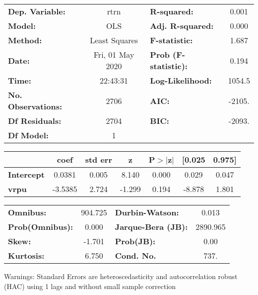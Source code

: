 \begin{center}
\begin{tabular}{lclc}
\toprule
\textbf{Dep. Variable:}    &       rtrn       & \textbf{  R-squared:         } &     0.001   \\
\textbf{Model:}            &       OLS        & \textbf{  Adj. R-squared:    } &     0.000   \\
\textbf{Method:}           &  Least Squares   & \textbf{  F-statistic:       } &     1.687   \\
\textbf{Date:}             & Fri, 01 May 2020 & \textbf{  Prob (F-statistic):} &    0.194    \\
\textbf{Time:}             &     22:43:31     & \textbf{  Log-Likelihood:    } &    1054.5   \\
\textbf{No. Observations:} &        2706      & \textbf{  AIC:               } &    -2105.   \\
\textbf{Df Residuals:}     &        2704      & \textbf{  BIC:               } &    -2093.   \\
\textbf{Df Model:}         &           1      & \textbf{                     } &             \\
\bottomrule
\end{tabular}
\begin{tabular}{lcccccc}
                   & \textbf{coef} & \textbf{std err} & \textbf{z} & \textbf{P$> |$z$|$} & \textbf{[0.025} & \textbf{0.975]}  \\
\midrule
\textbf{Intercept} &       0.0381  &        0.005     &     8.140  &         0.000        &        0.029    &        0.047     \\
\textbf{vrpu}      &      -3.5385  &        2.724     &    -1.299  &         0.194        &       -8.878    &        1.801     \\
\bottomrule
\end{tabular}
\begin{tabular}{lclc}
\textbf{Omnibus:}       & 904.725 & \textbf{  Durbin-Watson:     } &    0.013  \\
\textbf{Prob(Omnibus):} &   0.000 & \textbf{  Jarque-Bera (JB):  } & 2890.965  \\
\textbf{Skew:}          &  -1.701 & \textbf{  Prob(JB):          } &     0.00  \\
\textbf{Kurtosis:}      &   6.750 & \textbf{  Cond. No.          } &     737.  \\
\bottomrule
\end{tabular}
\end{center}

Warnings: \newline
 [1] Standard Errors are heteroscedasticity and autocorrelation robust (HAC) using 1 lags and without small sample correction